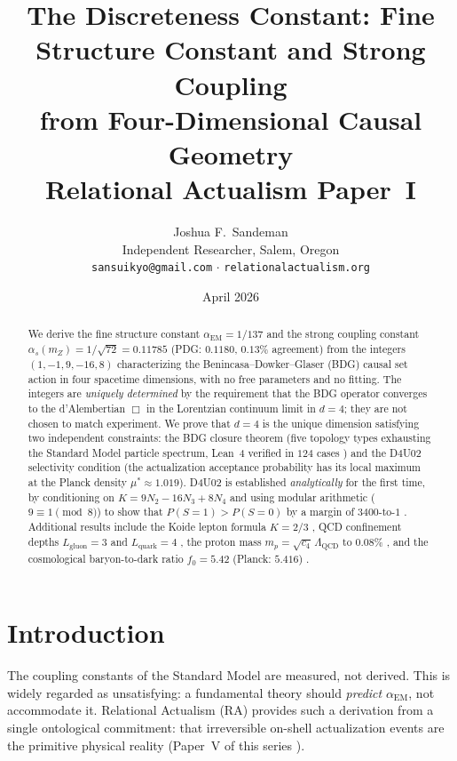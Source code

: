 \documentclass[12pt,a4paper]{article}
\title{\textbf{The Discreteness Constant: Fine Structure Constant and Strong Coupling\\
from Four-Dimensional Causal Geometry}\\[0.4em]
\large\normalfont Relational Actualism Paper~I}
\author{Joshua F.~Sandeman\\[0.3em]
\small Independent Researcher, Salem, Oregon\\
\small \texttt{sansuikyo@gmail.com} $\cdot$ \texttt{relationalactualism.org}}
\date{April 2026}
\begin{document}
\maketitle
\begin{abstract}
We derive the fine structure constant $\alpha_{\mathrm{EM}} = 1/137$ and the strong coupling constant $\alpha_s(m_Z) = 1/\sqrt{72} = 0.11785$ (PDG: $0.1180$, $0.13\%$ agreement) from the integers $(1,-1,9,-16,8)$ characterizing the Benincasa--Dowker--Glaser (BDG) causal set action in four spacetime dimensions, with no free parameters and no fitting.  The integers are \emph{uniquely determined} by the requirement that the BDG operator converges to the d'Alembertian $\Box$ in the Lorentzian continuum limit in $d=4$; they are not chosen to match experiment.  We prove that $d=4$ is the unique dimension satisfying two independent constraints: the BDG closure theorem (five topology types exhausting the Standard Model particle spectrum, Lean~4 verified in $124$ cases \statusLV) and the D4U02 selectivity condition (the actualization acceptance probability has its local maximum at the Planck density $\mu^* \approx 1.019$).  D4U02 is established \emph{analytically} for the first time, by conditioning on $K = 9N_2 - 16N_3 + 8N_4$ and using modular arithmetic ($9 \equiv 1 \pmod{8}$) to show that $P(S=1) > P(S=0)$ by a margin of $3400$-to-$1$ \statusDR.  Additional results include the Koide lepton formula $K = 2/3$ \statusLV, QCD confinement depths $L_{\text{gluon}}=3$ and $L_{\text{quark}}=4$ \statusLV, the proton mass $m_p = \sqrt{c_4}\,\Lambda_{\text{QCD}}$ to $0.08\%$ \statusCV, and the cosmological baryon-to-dark ratio $f_0 = 5.42$ (Planck: $5.416$) \statusCV.
\end{abstract}

\tableofcontents

\section{Introduction}

The coupling constants of the Standard Model are measured, not derived.  This is widely regarded as unsatisfying: a fundamental theory should \emph{predict} $\alpha_{\mathrm{EM}}$, not accommodate it.  Relational Actualism (RA) provides such a derivation from a single ontological commitment: that irreversible on-shell actualization events are the primitive physical reality (Paper~V of this series \cite{RA_P5}).
\end{document}
